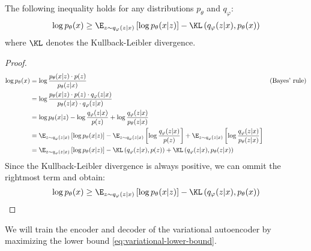 \begin{property}
    The following inequality holds for any distributions $p_\theta$ and $q_\varphi$:
    \begin{equation}
        \label{eq:variational-lower-bound}
        \log p_\theta(x) \geq \E_{z\sim q_\varphi(z|x)}\left[\log p_\theta(x|z)\right] - \KL\left(q_\varphi(z|x), p_\theta(x)\right)
    \end{equation}
    where $\KL$ denotes the Kullback-Leibler divergence.
\end{property}
\begin{proof}
    \begin{align*}
        \log p_\theta(x) &= \log\frac{p_\theta(x|z)\cdot p(z)}{p_\theta(z|x)} && \text{(Bayes' rule)} \\
        &= \log\frac{p_\theta(x|z)\cdot p(z)\cdot q_\varphi(z|x)}{p_\theta(z|x)\cdot q_\varphi(z|x)} \\
        &= \log p_\theta(x|z) - \log\frac{q_\varphi(z|x)}{p(z)} + \log\frac{q_\varphi(z|x)}{p_\theta(z|x)} \\
        &= \E_{z\sim q_\varphi(z|x)}\left[\log p_\theta(x|z)\right] - \E_{z\sim q_\varphi(z|x)}\left[\log\frac{q_\varphi(z|x)}{p(z)}\right] + \E_{z\sim q_\varphi(z|x)}\left[\log\frac{q_\varphi(z|x)}{p_\theta(z|x)}\right] \\
        &= \E_{z\sim q_\varphi(z|x)}\left[\log p_\theta(x|z)\right] - \KL\left(q_\varphi(z|x), p(z)\right) + \KL\left(q_\varphi(z|x), p_\theta(z|x)\right)
    \end{align*}
    Since the Kullback-Leibler divergence is always positive, we can ommit the rightmost term and obtain:
    \begin{equation*}
        \log p_\theta(x) \geq \E_{z\sim q_\varphi(z|x)}\left[\log p_\theta(x|z)\right] - \KL\left(q_\varphi(z|x), p_\theta(x)\right)
    \end{equation*}
\end{proof}

We will train the encoder and decoder of the variational autoencoder by maximizing the lower bound \autoref{eq:variational-lower-bound}.  

\newpage